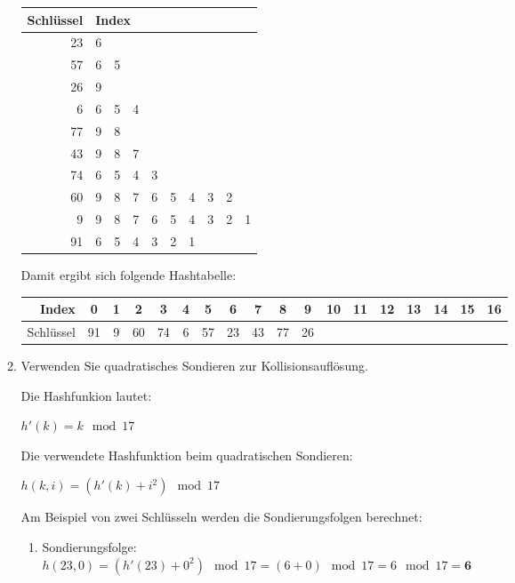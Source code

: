\documentclass{lehramt-informatik-aufgabe}
\begin{document}
\begin{enumerate}
\begin{enumerate}
\begin{antwort}
{\begin{tabular}{r|ccccccccc}
Schlüssel & \multicolumn{6}{l}{Index}\\\hline
23 & 6\\
57 & 6 & 5\\
26 & 9\\
6  & 6 & 5 & 4\\
77 & 9 & 8\\
43 & 9 & 8 & 7\\
74 & 6 & 5 & 4 & 3 \\
60 & 9 & 8 & 7 & 6 & 5 & 4 & 3 & 2\\
9  & 9 & 8 & 7 & 6 & 5 & 4 & 3 & 2 & 1 \\
91 & 6 & 5 & 4 & 3 & 2 & 1\\
\end{tabular}

Damit ergibt sich folgende Hashtabelle:

\begin{tabular}{r|ccccccccccccccccc}
Index & 0 & 1 & 2 & 3 & 4 & 5 & 6 & 7 & 8 & 9 & 10 & 11 & 12 & 13 & 14 & 15 & 16 \\\hline
Schlüssel &91&9&60&74&6&57&23&43&77&26&&&&&&&\\
\end{tabular}
}
\end{antwort}


\item Verwenden Sie quadratisches Sondieren zur Kollisionsauflösung.

\begin{antwort}

\def\tmp#1{{\footnotesize#1}}

Die Hashfunkion lautet:

\tmp{$h'(k) = k \mod 17$}

Die verwendete Hashfunktion beim quadratischen Sondieren:

\tmp{$h(k, i) = (h'(k) + i^2) \mod 17$}

\bigskip

Am Beispiel von zwei Schlüsseln werden die Sondierungsfolgen berechnet:

\bigskip


\begin{enumerate}
\item Sondierungsfolge: \\
\tmp{$h(23, 0) = (h'(23) + 0^2) \mod 17 = (6 + 0) \mod 17 = 6 \mod 17 = \textbf{6}$}


\end{enumerate}
\end{antwort}
\end{enumerate}
\end{enumerate}
\end{document}
